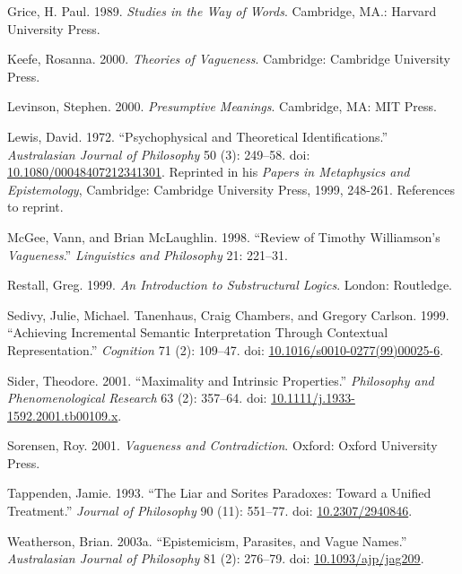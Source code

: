 \documentclass[
  11pt,
  letterpaper,
  DIV=11,
  numbers=noendperiod,
  twoside]{scrartcl}
\newlength{\cslhangindent}
\newenvironment{CSLReferences}[2] %
 {\begin{list}{}{%
  \setlength{\itemindent}{0pt}
  \setlength{\leftmargin}{0pt}
  \setlength{\parsep}{0pt}
  \ifodd #1
   \setlength{\leftmargin}{\cslhangindent}
   \setlength{\itemindent}{-1\cslhangindent}
  \fi
  \setlength{\itemsep}{#2\baselineskip}}}
 {\end{list}}
\begin{document}
\begin{CSLReferences}{1}{0}
Grice, H. Paul. 1989. \emph{Studies in the Way of Words}. Cambridge,
MA.: Harvard University Press.

Keefe, Rosanna. 2000. \emph{Theories of Vagueness}. Cambridge: Cambridge
University Press.

Levinson, Stephen. 2000. \emph{Presumptive Meanings}. Cambridge, MA: MIT
Press.

Lewis, David. 1972. {``Psychophysical and Theoretical
Identifications.''} \emph{Australasian Journal of Philosophy} 50 (3):
249--58. doi:
\href{https://doi.org/10.1080/00048407212341301}{10.1080/00048407212341301}.
Reprinted in his \emph{Papers in Metaphysics and Epistemology},
Cambridge: Cambridge University Press, 1999, 248-261. References to
reprint.

McGee, Vann, and Brian McLaughlin. 1998. {``Review of Timothy
Williamson's \emph{Vagueness}.''} \emph{Linguistics and Philosophy} 21:
221--31.

Restall, Greg. 1999. \emph{An Introduction to Substructural Logics}.
London: Routledge.

Sedivy, Julie, Michael. Tanenhaus, Craig Chambers, and Gregory Carlson.
1999. {``Achieving Incremental Semantic Interpretation Through
Contextual Representation.''} \emph{Cognition} 71 (2): 109--47. doi:
\href{https://doi.org/10.1016/s0010-0277(99)00025-6}{10.1016/s0010-0277(99)00025-6}.

Sider, Theodore. 2001. {``Maximality and Intrinsic Properties.''}
\emph{Philosophy and Phenomenological Research} 63 (2): 357--64. doi:
\href{https://doi.org/10.1111/j.1933-1592.2001.tb00109.x}{10.1111/j.1933-1592.2001.tb00109.x}.

Sorensen, Roy. 2001. \emph{Vagueness and Contradiction}. Oxford: Oxford
University Press.

Tappenden, Jamie. 1993. {``The Liar and Sorites Paradoxes: Toward a
Unified Treatment.''} \emph{Journal of Philosophy} 90 (11): 551--77.
doi: \href{https://doi.org/10.2307/2940846}{10.2307/2940846}.

Weatherson, Brian. 2003a. {``Epistemicism, Parasites, and Vague
Names.''} \emph{Australasian Journal of Philosophy} 81 (2): 276--79.
doi: \href{https://doi.org/10.1093/ajp/jag209}{10.1093/ajp/jag209}.


\end{CSLReferences}
\end{document}
